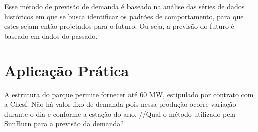 Esse método de previsão de demanda é baseado na análise das séries de dados históricos em que se busca identificar os padrões de comportamento, para que estes sejam então projetados para o futuro. Ou seja, a previsão do futuro é baseado em dados do passado.

\section{Aplicação Prática}
\label{sec:introducao_ao_planejamento_aplicacao}
A estrutura do parque permite fornecer até 60 MW, estipulado por contrato com a Chesf. 
Não há valor fixo de demanda pois nessa produção ocorre variação durante o dia e conforme a estação do ano. 
//Qual o método utilizado pela SunBurn para a previsão da demanda?
